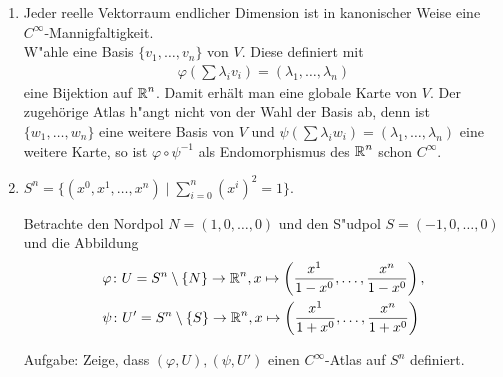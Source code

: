 \begin{bsp}
\begin{enumerate}[leftmargin=*,label=\arabic*)]
  \item Jeder reelle Vektorraum endlicher Dimension ist in kanonischer Weise eine $C^{\infty}$-Mannigfaltigkeit.\\
    W"ahle eine Basis $\{v_1, \ldots, v_n\}$ von $V$. Diese definiert mit
    \begin{align*}
      \varphi\left(\sum\lambda_iv_i\right) = (\lambda_1, \ldots, \lambda_n)
    \end{align*}
    eine Bijektion auf $\operatorname{\mathbb{R}}^n$. Damit erhält man eine globale Karte von $V$.
    Der zugehörige Atlas h"angt nicht von der Wahl der Basis ab, denn ist $\{w_1, \ldots, w_n\}$ eine weitere Basis von $V$ und $\psi(\sum \lambda_iw_i) = (\lambda_1, \ldots, \lambda_n)$ eine weitere Karte, so ist $\varphi \circ \psi^{-1}$ als \gls{Endomorphismus} des $\operatorname{\mathbb{R}}^n$ schon $C^{\infty}$.

  \item $S^n = \{(x^0, x^1, \ldots, x^n) \mid \sum_{i = 0}^n(x^{i})^2 = 1\}$.\\

    
    Betrachte den Nordpol $N = (1,0,\ldots,0)$ und den S"udpol $S = (-1,0,\ldots,0)$ und die Abbildung
    \begin{align*}
      & \varphi \colon U = S^{n}\setminus\{N\} \to \operatorname{\mathbb{R}}^n, x \mapsto \left(\frac{x^1}{1-x^0}, \ldots, \frac{x^{n}}{1-x^0}\right),\\
      & \psi \colon U' = S^{n} \setminus \{S\} \to \operatorname{\mathbb{R}}^n, x \mapsto \left(\frac{x^1}{1+x^0}, \ldots, \frac{x^n}{1+x^0}\right)
    \end{align*}

    Aufgabe: Zeige, dass $(\varphi, U), (\psi, U')$ einen $C^{\infty}$-Atlas auf $S^n$ definiert.

  \end{enumerate}
\end{bsp}

